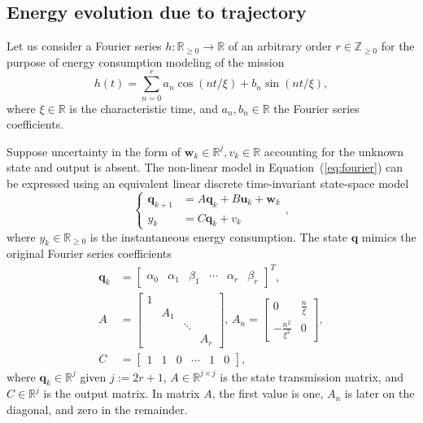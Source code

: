 \documentclass[letterpaper,10pt,conference]{ieeeconf}
\theoremstyle{definition}
\begin{document}
\subsection{Energy evolution due to trajectory}
\label{sec:energy-model}

Let us consider a Fourier series $h:\mathbb{R}_{\geq 0}\rightarrow\mathbb{R}$ of an arbitrary order $r\in\mathbb{Z}_{\geq 0}$ for the purpose of energy consumption modeling of the mission
\begin{equation}\label{eq:fourier}
  h(t)=\sum_{n=0}^{r}{a_n\cos\left({nt/\xi}\right)+b_n\sin{\left({nt/\xi}\right)}},
\end{equation}
where $\xi\in\mathbb{R}$ is the characteristic time, and $a_n, b_n\in\mathbb{R}$ the Fourier series coefficients.

Suppose uncertainty in the form of $\mathbf{w}_k\in\mathbb{R}^j,v_k\in\mathbb{R}$ accounting for the unknown state and output is absent. The non-linear model in Equation~(\ref{eq:fourier}) can be expressed using an equivalent linear discrete time-invariant state-space model
\begin{equation}\label{eq:state-perf}\begin{cases}
  \mathbf{q}_{k+1}&=A\mathbf{q}_{k}+B\mathbf{u}_{k}+\mathbf{w}_k\\
  y_k&=C\mathbf{q}_k+v_k
\end{cases},\end{equation}
where $y_k\in\mathbb{R}_{\geq 0}$ is the instantaneous energy consumption. The state $\mathbf{q}$ mimics the original Fourier series coefficients
\begin{equation}\label{eq:state-details}\begin{split}
  \mathbf{q}_k&=\left[\begin{array}{cccccc}
    \alpha_0 & \alpha_1 & \beta_1 & \cdots & \alpha_r & \beta_r
  \end{array}\right]^T,\\
  A&=\left[\begin{array}{cccc}
    1&    &       &  \\
     & A_1&       &  \\
     &    & \ddots&  \\
     &    &       & A_r 
  \end{array}\right],\,A_n=\begin{bmatrix}0 & \frac{n}{\xi} \\ -\frac{n^2}{\xi^2} & 0\end{bmatrix},\\
  C&=\left[\begin{array}{cccccc}
    1 & 1 & 0 & \cdots & 1 & 0
  \end{array}\right],
\end{split}\end{equation}
where $\mathbf{q}_k\in\mathbb{R}^j$ given $j:=2r+1$, $A\in\mathbb{R}^{j\times j}$ is the state transmission matrix, and $C\in\mathbb{R}^j$ is the output matrix. In matrix $A$, the first value is one, $A_n$ is later on the diagonal, and zero in the remainder.
\end{document}
